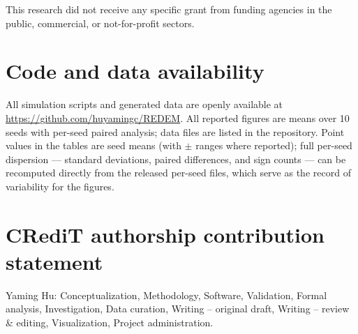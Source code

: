 \documentclass[preprint,12pt]{elsarticle}
\begin{document}
This research did not receive any specific grant from funding agencies in
the public, commercial, or not-for-profit sectors.

\section*{Code and data availability}
{\sloppy
All simulation scripts and generated data are openly available at
\url{https://github.com/huyamingc/REDEM}. All reported figures are means
over 10 seeds with
per-seed paired analysis; data files are listed in the repository.
Point values in the tables are seed means (with $\pm$ ranges where
reported); full per-seed dispersion --- standard deviations, paired
differences, and sign counts --- can be recomputed directly from the
released per-seed files, which serve as the record of variability for
the figures.\par}

\section*{CRediT authorship contribution statement}

Yaming Hu: Conceptualization, Methodology, Software, Validation, Formal
analysis, Investigation, Data curation, Writing -- original draft,
Writing -- review \& editing, Visualization, Project administration.
\end{document}
